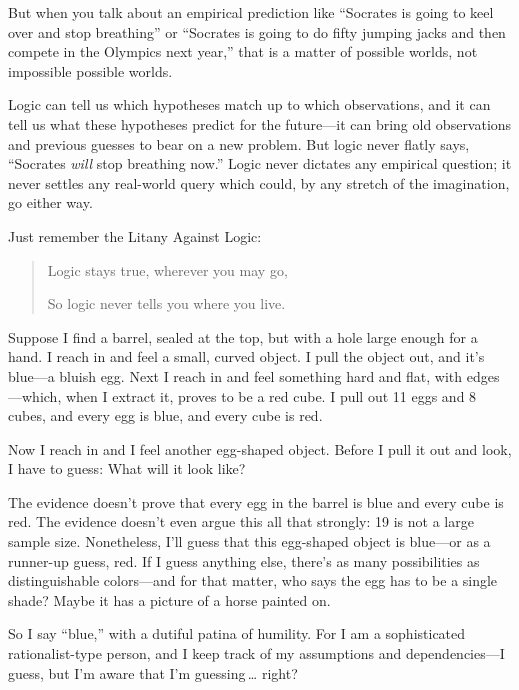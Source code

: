 { But when you talk about an empirical prediction like
``Socrates is going to keel over and stop
breathing'' or ``Socrates is going
to do fifty jumping jacks and then compete in the Olympics next
year,'' that is a matter of possible worlds, not
impossible possible worlds.


 Logic can tell us which hypotheses match up to which observations,
and it can tell us what these hypotheses predict for the future---it
can bring old observations and previous guesses to bear on a new
problem. But logic never flatly says, ``Socrates
\textit{will} stop breathing now.'' Logic never
dictates any empirical question; it never settles any real-world query
which could, by any stretch of the imagination, go either way.


 Just remember the Litany Against Logic:

\begin{quote}

 Logic stays true, wherever you may go,

{
  So logic never tells you where you live.}
\end{quote}

\myendsectiontext



 Suppose I find a barrel, sealed at the top, but with a hole large
enough for a hand. I reach in and feel a small, curved object. I pull
the object out, and it's blue---a bluish egg. Next I
reach in and feel something hard and flat, with edges---which, when I
extract it, proves to be a red cube. I pull out 11 eggs and 8 cubes,
and every egg is blue, and every cube is red. 


 Now I reach in and I feel another egg-shaped object. Before I pull
it out and look, I have to guess: What will it look like?


 The evidence doesn't prove that every egg in the
barrel is blue and every cube is red. The evidence
doesn't even argue this all that strongly: 19 is not a
large sample size. Nonetheless, I'll guess that this
egg-shaped object is blue---or as a runner-up guess, red. If I guess
anything else, there's as many possibilities as
distinguishable colors---and for that matter, who says the egg has to
be a single shade? Maybe it has a picture of a horse painted on.


 So I say ``blue,'' with a
dutiful patina of humility. For I am a sophisticated rationalist-type
person, and I keep track of my assumptions and dependencies---I guess,
but I'm aware that I'm guessing\,\ldots
right?


}
